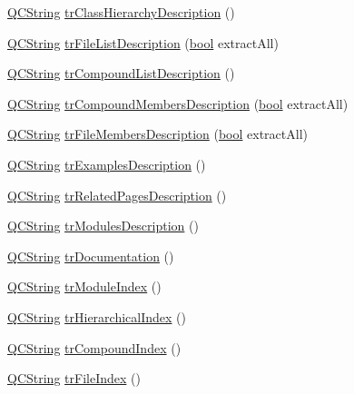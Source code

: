 \begin{DoxyCompactItemize}
\item 
\hyperlink{class_q_c_string}{Q\+C\+String} \hyperlink{class_translator_dutch_a1720f87757a5c47970fe0dc275faac01}{tr\+Class\+Hierarchy\+Description} ()
\item 
\hyperlink{class_q_c_string}{Q\+C\+String} \hyperlink{class_translator_dutch_aeacfbf97d8785c7aba521b006ec2a857}{tr\+File\+List\+Description} (\hyperlink{qglobal_8h_a1062901a7428fdd9c7f180f5e01ea056}{bool} extract\+All)
\item 
\hyperlink{class_q_c_string}{Q\+C\+String} \hyperlink{class_translator_dutch_a32f73c3dc9bfbf3673c0a18ec2883f21}{tr\+Compound\+List\+Description} ()
\item 
\hyperlink{class_q_c_string}{Q\+C\+String} \hyperlink{class_translator_dutch_a270a476f61251ee4f883d439d5dff7f1}{tr\+Compound\+Members\+Description} (\hyperlink{qglobal_8h_a1062901a7428fdd9c7f180f5e01ea056}{bool} extract\+All)
\item 
\hyperlink{class_q_c_string}{Q\+C\+String} \hyperlink{class_translator_dutch_ae8a9024a337e81bf71f8b9815238aba5}{tr\+File\+Members\+Description} (\hyperlink{qglobal_8h_a1062901a7428fdd9c7f180f5e01ea056}{bool} extract\+All)
\item 
\hyperlink{class_q_c_string}{Q\+C\+String} \hyperlink{class_translator_dutch_a7cf080dbd871175502743cb5ddbb1790}{tr\+Examples\+Description} ()
\item 
\hyperlink{class_q_c_string}{Q\+C\+String} \hyperlink{class_translator_dutch_ac8061d91a184e10b86e02463a8cb587b}{tr\+Related\+Pages\+Description} ()
\item 
\hyperlink{class_q_c_string}{Q\+C\+String} \hyperlink{class_translator_dutch_a429b60cb03289b8dfcf1c59cf9d1bac9}{tr\+Modules\+Description} ()
\item 
\hyperlink{class_q_c_string}{Q\+C\+String} \hyperlink{class_translator_dutch_ac5d7a8623edf678fafd7c7df99075da1}{tr\+Documentation} ()
\item 
\hyperlink{class_q_c_string}{Q\+C\+String} \hyperlink{class_translator_dutch_ab9e1027031320f54f6796cef0aadc401}{tr\+Module\+Index} ()
\item 
\hyperlink{class_q_c_string}{Q\+C\+String} \hyperlink{class_translator_dutch_a506e2bbdcdb983f9b218ebe99a5515d8}{tr\+Hierarchical\+Index} ()
\item 
\hyperlink{class_q_c_string}{Q\+C\+String} \hyperlink{class_translator_dutch_a4dce54e4a3169efce763c52761cee074}{tr\+Compound\+Index} ()
\item 
\hyperlink{class_q_c_string}{Q\+C\+String} \hyperlink{class_translator_dutch_a97a4740cd9d4f82bdadb29cbcc11b494}{tr\+File\+Index} ()

\end{DoxyCompactItemize}
